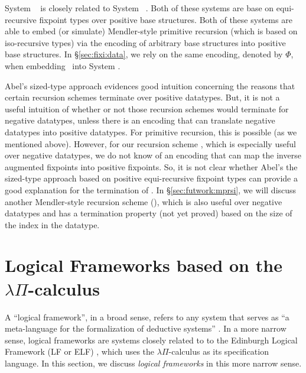 System \Fwhat\ \cite{abel06phd} is closely related to
System \Fixw\ \cite{AbeMat04}. Both of these systems are base on
equi-recursive fixpoint types over positive base structures.
Both of these systems are able to embed (or simulate) Mendler-style
primitive recursion (which is based on iso-recursive types) via
the encoding \cite{Geu92} of arbitrary base structures into
positive base structures. In \S\ref{sec:fixi:data}, we rely on
the same encoding, denoted by $\Phi$, when embedding \MPr\ into System \Fixi.

Abel's sized-type approach evidences good intuition concerning the reasons
that certain recursion schemes terminate over positive datatypes.
But, it is not a useful intuition of whether or not those recursion schemes
would terminate for negative datatypes, unless there is an encoding that can
translate negative datatypes into positive datatypes. For primitive recursion,
this is possible (as we mentioned above). However, for our recursion scheme
\MsfIt, which is especially useful over negative datatypes, we do not know of
an encoding that can map the inverse augmented fixpoints into
positive fixpoints. So, it is not clear whether Abel's the sized-type approach
based on positive equi-recursive fixpoint types can provide a good explanation
for the termination of \MsfIt. In \S\ref{sec:futwork:mprsi}, we will discuss
another Mendler-style recursion scheme (\mprsi), which is also useful over
negative datatypes and has a termination property (not yet proved) based on 
the size of the index in the datatype.

\section{Logical Frameworks based on the $\lambda\Pi$-calculus}
\label{sec:relwork:LF}
A ``logical framework'', in a broad sense, refers to
any system that serves as ``a meta-language for
the formalization of deductive systems'' \cite{Pfe02LFintro}.
In a more narrow sense, logical frameworks are systems closely related to
to the Edinburgh Logical Framework (LF or ELF) \cite{Harper87}, which uses
the $\lambda\Pi$-calculus as its specification language. In this section,
we discuss \emph{logical frameworks} in this more narrow sense.

